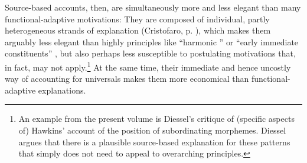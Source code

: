 \documentclass[output=paper]{langsci/langscibook}
\begin{document}
Source-based accounts, then, are simultaneously more and less elegant than many functional-adaptive motivations: They are composed of individual, partly heterogeneous strands of explanation (Cristofaro, p. \pageref{p:cristofaro:strands}), which makes them arguably less elegant than highly  principles like “harmonic ” \citep{Aissen2003} or “early immediate constituents” \citep{Hawkins1994}, but also perhaps less susceptible to postulating motivations that, in fact, may not apply.\footnote{An example from the present volume is Diessel’s critique of (specific aspects of) Hawkins’  account of the position of subordinating morphemes. Diessel argues that there is a plausible source-based explanation for these patterns that simply does not need to appeal to overarching  principles.} At the same time, their immediate and hence uncostly way of accounting for universals makes them more economical than functional-adaptive explanations. 
\end{document}
